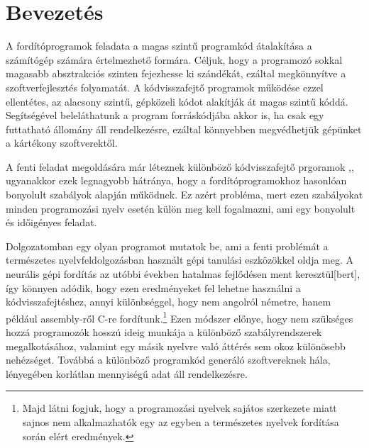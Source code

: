 \chapter{Bevezetés}
\label{ch:intro}

A fordítóprogramok feladata a magas szintű programkód átalakítása a számítógép számára értelmezhető formára. Céljuk, hogy a programozó sokkal magasabb absztrakciós szinten fejezhesse ki szándékát, ezáltal megkönnyítve a szoftverfejlesztés folyamatát. A kódvisszafejtő programok működése ezzel ellentétes, az alacsony szintű, gépközeli kódot alakítják át magas szintű kóddá. Segítségével beleláthatunk a program forráskódjába akkor is, ha csak egy futtatható állomány áll rendelkezésre, ezáltal könnyebben megvédhetjük gépünket a kártékony szoftverektől.

A fenti feladat megoldására már léteznek különböző kódvisszafejtő prgoramok \cite{ghidra},\cite{binaryninja}, ugyanakkor ezek legnagyobb hátránya, hogy a fordítóprogramokhoz hasonlóan bonyolult szabályok alapján működnek. Ez azért probléma, mert ezen szabályokat minden programozási nyelv esetén külön meg kell fogalmazni, ami egy bonyolult és időigényes feladat.

Dolgozatomban egy olyan programot mutatok be, ami a fenti problémát a természetes nyelvfeldolgozásban használt gépi tanulási eszközökkel oldja meg. A neurális gépi fordítás az utóbbi években hatalmas fejlődésen ment keresztül[bert], így könnyen adódik, hogy ezen eredményeket fel lehetne használni a kódvisszafejtéshez, annyi különbséggel, hogy nem angolról németre, hanem például assembly-ről C-re fordítunk.\footnote{Majd látni fogjuk, hogy a programozási nyelvek sajátos szerkezete miatt sajnos nem alkalmazhatók egy az egyben a természetes nyelvek fordítása során elért eredmények.} Ezen módszer előnye, hogy nem szükséges hozzá programozók hosszú ideig munkája a különböző szabályrendszerek megalkotásához, valamint egy másik nyelvre való áttérés sem okoz különösebb nehézséget. Továbbá a különböző programkód generáló szoftvereknek\cite{??} hála, lényegében korlátlan mennyiségű adat áll rendelkezésre.
